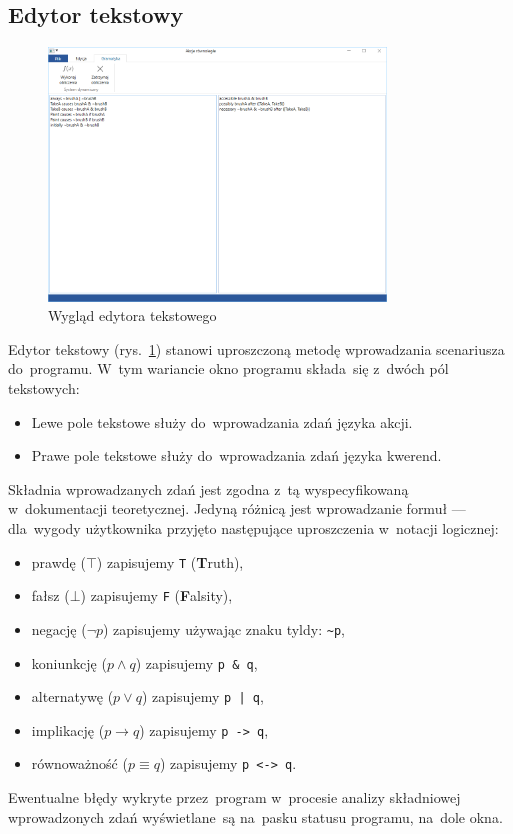 \documentclass[11pt,a4paper]{article}
\begin{document}
\subsection{Edytor tekstowy}

\begin{figure}[H]
    \centering
    \includegraphics[width=0.8\textwidth]{res/img/grammar-editor.png}
    \caption{Wygląd edytora tekstowego}
    \label{fig:grammar-editor}
\end{figure}

Edytor tekstowy (rys.~\ref{fig:grammar-editor}) stanowi uproszczoną metodę wprowadzania scenariusza do~programu.
W~tym wariancie okno programu składa~się z~dwóch pól tekstowych:
\begin{itemize}
    \item Lewe pole tekstowe służy do~wprowadzania zdań języka akcji.
    \item Prawe pole tekstowe służy do~wprowadzania zdań języka kwerend.
\end{itemize}
Składnia wprowadzanych zdań jest zgodna z~tą wyspecyfikowaną w~dokumentacji teoretycznej.
Jedyną różnicą jest wprowadzanie formuł --- dla~wygody użytkownika przyjęto następujące uproszczenia w~notacji logicznej:
\begin{itemize}
    \item prawdę ($\top$) zapisujemy \verb+T+ (\textbf{T}ruth),
    \item fałsz ($\bot$) zapisujemy \verb+F+ (\textbf{F}alsity),
    \item negację ($\neg p$) zapisujemy używając znaku tyldy: \verb+~p+,
    \item koniunkcję ($p \land q$) zapisujemy \verb+p & q+,
    \item alternatywę ($p \lor q$) zapisujemy \verb+p | q+,
    \item implikację ($p \rightarrow q$) zapisujemy \verb+p -> q+,
    \item równoważność ($p \equiv q$) zapisujemy \verb+p <-> q+.
\end{itemize}
Ewentualne błędy wykryte przez~program w~procesie analizy składniowej wprowadzonych zdań wyświetlane~są na~pasku statusu programu, na~dole okna.
\end{document}
